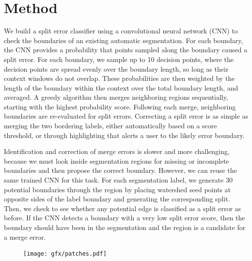 \section{Method}
We build a split error classifier using a convolutional neural network (CNN) to check the boundaries of an existing automatic segmentation. For each boundary, the CNN provides a probability that points sampled along the boundary caused a split error. For each boundary, we sample up to 10 decision points, where the decision points are spread evenly over the boundary length, so long as their context windows do not overlap. These probabilities are then weighted by the length of the boundary within the context over the total boundary length, and averaged. A greedy algorithm then merges neighboring regions sequentially, starting with the highest probability score. Following each merge, neighboring boundaries are re-evaluated for split errors. Correcting a split error is as simple as merging the two bordering labels, either automatically based on a score threshold, or through highlighting that alerts a user to the likely error boundary.

Identification and correction of merge errors is slower and more challenging, because we must look inside segmentation regions for missing or incomplete boundaries and then propose the correct boundary. However, we can reuse the same trained CNN for this task. For each segmentation label, we generate 30 potential boundaries through the region by placing watershed seed points at opposite sides of the label boundary and generating the corresponding split. Then, we check to see whether any potential edge is classified as a split error as before. If the CNN detects a boundary with a very low split error score, then the boundary should have been in the segmentation and the region is a candidate for a merge error.






\begin{figure}[t]
\centering
\texttt{[image: gfx/patches.pdf]}
\caption{}
\label{fig:patches}
\end{figure}


